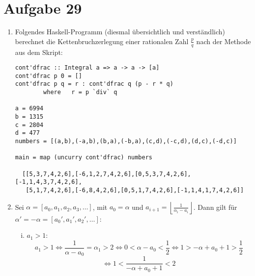 \section*{Aufgabe 29}
\begin{enumerate}[(1)]
	\item
	Folgendes Haskell-Programm (diesmal übersichtlich und verständlich) berechnet
	die Kettenbruchzerlegung einer rationalen Zahl $\frac{p}{q}$ nach der Methode
	aus dem Skript:
	\begin{lstlisting}
cont'dfrac :: Integral a => a -> a -> [a]
cont'dfrac p 0 = []
cont'dfrac p q = r : cont'dfrac q (p - r * q)
        where   r = p `div` q 

a = 6994
b = 1315
c = 2804
d = 477
numbers = [(a,b),(-a,b),(b,a),(-b,a),(c,d),(-c,d),(d,c),(-d,c)]

main = map (uncurry cont'dfrac) numbers

  [[5,3,7,4,2,6],[-6,1,2,7,4,2,6],[0,5,3,7,4,2,6],[-1,1,4,3,7,4,2,6],
   [5,1,7,4,2,6],[-6,8,4,2,6],[0,5,1,7,4,2,6],[-1,1,4,1,7,4,2,6]]
	\end{lstlisting}
	\item Sei $\alpha = [a_0, a_1, a_2, a_3, \ldots]$, mit $a_0 = \alpha$
	und $a_{i+1} = \left\lfloor \frac{1}{\alpha_i - a_i} \right\rfloor $.
	Dann gilt für $\alpha' = -\alpha = [a_0', a_1', a_2', \ldots]$:
	\begin{enumerate}[(i)]
		\item $a_1 > 1$:
		\[ a_1 > 1  \Leftrightarrow \frac{1}{\alpha - a_0} = \alpha_1 > 2 
		\Leftrightarrow 0 < \alpha - a_0 < \frac{1}{2} 
		\Leftrightarrow 1 > -\alpha + a_0 + 1 > \frac{1}{2} \] 
		\[ \Leftrightarrow 1 < \frac{1}{-\alpha + a_0 + 1} < 2 \]


\end{enumerate}
\end{enumerate}
